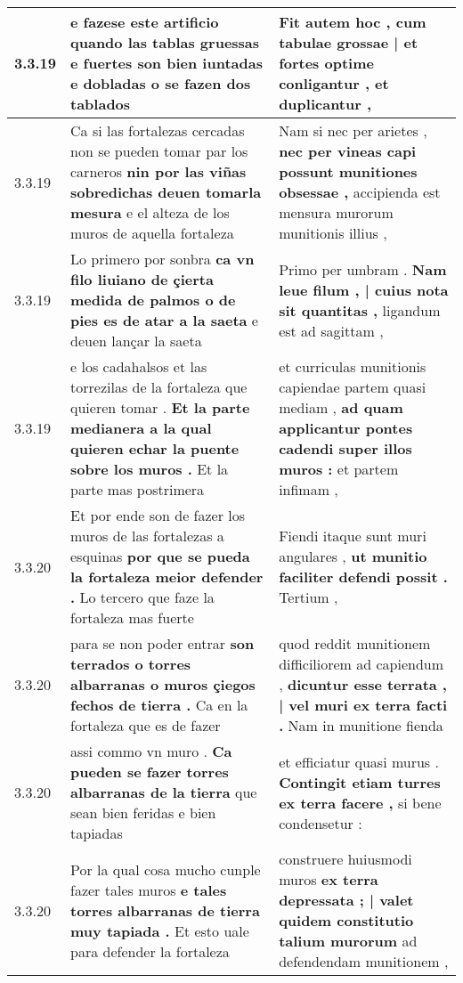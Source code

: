 \begin{tabular}{|p{1cm}|p{6.5cm}|p{6.5cm}|}
3.3.19 & e fazese este artificio \textbf{ quando las tablas gruessas e fuertes son bien iuntadas e dobladas } o se fazen dos tablados & Fit autem hoc , \textbf{ cum tabulae grossae | et fortes optime conligantur , } et duplicantur , \\\hline
3.3.19 & Ca si las fortalezas cercadas non se pueden tomar par los carneros \textbf{ nin por las viñas sobredichas deuen tomarla mesura } e el alteza de los muros de aquella fortaleza & Nam si nec per arietes , \textbf{ nec per vineas capi possunt munitiones obsessae , } accipienda est mensura murorum munitionis illius , \\\hline
3.3.19 & Lo primero por sonbra \textbf{ ca vn filo liuiano de çierta medida de palmos o de pies es de atar a la saeta } e deuen lançar la saeta & Primo per umbram . \textbf{ Nam leue filum , | cuius nota sit quantitas , } ligandum est ad sagittam , \\\hline
3.3.19 & e los cadahalsos et las torrezilas de la fortaleza que quieren tomar . \textbf{ Et la parte medianera a la qual quieren echar la puente sobre los muros . } Et la parte mas postrimera & et curriculas munitionis capiendae partem quasi mediam , \textbf{ ad quam applicantur pontes cadendi super illos muros : } et partem infimam , \\\hline
3.3.20 & Et por ende son de fazer los muros de las fortalezas a esquinas \textbf{ por que se pueda la fortaleza meior defender . } Lo tercero que faze la fortaleza mas fuerte & Fiendi itaque sunt muri angulares , \textbf{ ut munitio faciliter defendi possit . } Tertium , \\\hline
3.3.20 & para se non poder entrar \textbf{ son terrados o torres albarranas o muros çiegos fechos de tierra . } Ca en la fortaleza que es de fazer & quod reddit munitionem difficiliorem ad capiendum , \textbf{ dicuntur esse terrata , | vel muri ex terra facti . } Nam in munitione fienda \\\hline
3.3.20 & assi commo vn muro . \textbf{ Ca pueden se fazer torres albarranas de la tierra } que sean bien feridas e bien tapiadas & et efficiatur quasi murus . \textbf{ Contingit etiam turres ex terra facere , } si bene condensetur : \\\hline
3.3.20 & Por la qual cosa mucho cunple fazer tales muros \textbf{ e tales torres albarranas de tierra muy tapiada . } Et esto uale para defender la fortaleza & construere huiusmodi muros \textbf{ ex terra depressata ; | valet quidem constitutio talium murorum } ad defendendam munitionem , \\\hline

\end{tabular}
